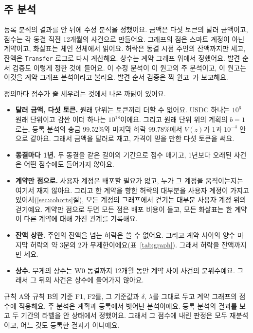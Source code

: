 \subsection{주 분석}
\label{sec:main}

등록 분석의 결과를 안 뒤에 수정 분석을 정했어요. 금액은 다섯 토큰의 달러 금액이고, 점수는 각 동결 직전 12개월의 사건으로 만들어요. 그래프의 점은 스마트 계정이 아닌 계약이고, 화살표는 체인 전체에서 읽어요. 허락은 동결 시점 주인의 잔액까지만 세고, 잔액은 \texttt{Transfer} 로그로 다시 계산해요. 상수는 계약 그래프 위에서 정했어요. 발견 순서 검증도 이렇게 정한 것에 들어요. 이 수정 분석이 이 원고의 주 분석이고, 이 원고는 이것을 계약 그래프 분석이라고 불러요. 발견 순서 검증은 짝 원고~\cite{kwon2026companion}가 보고해요.

정의마다 점수가 줄 세우려는 것에서 나온 까닭이 있어요.
\begin{itemize}
\item \textbf{달러 금액, 다섯 토큰.} 원래 단위는 토큰끼리 더할 수 없어요. USDC 하나는 $10^{6}$ 원래 단위이고 감싼 이더 하나는 $10^{18}$이에요. 그리고 원래 단위 위의 계획의 $b=1$로는, 등록 분석의 송금 99.52\%와 마지막 허락 99.78\%에서 $V(z)$가 1과 $10^{-4}$ 안으로 같아요. 그래서 금액을 달러로 재고, 가격이 믿을 만한 다섯 토큰을 써요.
\item \textbf{동결마다 1년.} 두 동결을 같은 길이의 기간으로 점수 매기고, 1년보다 오래된 사건은 어떤 점수에도 들어가지 않아요.
\item \textbf{계약만 점으로.} 사용자 계정은 배포할 필요가 없고, 누가 그 계정을 움직이는지는 여기서 재지 않아요. 그리고 한 계약을 향한 허락의 대부분을 사용자 계정이 가지고 있어서(\ref{sec:cohorts}절), 모든 계정의 그래프에서 걷기는 대부분 사용자 계정 위의 걷기예요. 계약만 점으로 두면 모든 점은 배포 비용이 들고, 모든 화살표는 한 계약이 다른 계약에 대해 가진 관계를 기록해요.
\item \textbf{잔액 상한.} 주인의 잔액을 넘는 허락은 쓸 수 없어요. 그리고 계약 사이의 양수 마지막 허락의 약 3분의 2가 무제한이에요(표~\ref{tab:graph}). 그래서 허락을 잔액까지만 세요.
\item \textbf{상수.} 무게의 상수는 W0 동결까지 12개월 동안 계약 사이 사건의 분위수예요. 그래서 그 뒤의 사건은 상수에 들어가지 않아요.
\end{itemize}

규칙 A와 규칙 B의 기준 F1, F2를, 그 기준값과 $\delta$, $\lambda$를 그대로 두고 계약 그래프의 점수에 적용해요. 주 분석은 계획과 등록에서 벗어난 분석이에요. 등록 분석의 결과를 보고 두 기간의 라벨을 안 상태에서 정했어요. 그래서 그 점수에 내린 판정은 모두 재분석이고, 어느 것도 등록한 결과가 아니에요.

